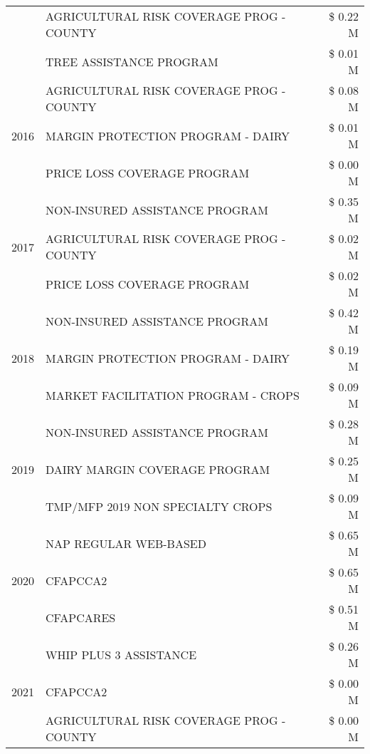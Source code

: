 \begin{tabular}{llr}
 & AGRICULTURAL RISK COVERAGE PROG - COUNTY & \$ 0.22 M \\
 & TREE ASSISTANCE PROGRAM & \$ 0.01 M \\
\cline{1-3}
\multirow[t]{3}{*}{2016} & AGRICULTURAL RISK COVERAGE PROG - COUNTY & \$ 0.08 M \\
 & MARGIN PROTECTION PROGRAM - DAIRY & \$ 0.01 M \\
 & PRICE LOSS COVERAGE PROGRAM & \$ 0.00 M \\
\cline{1-3}
\multirow[t]{3}{*}{2017} & NON-INSURED ASSISTANCE PROGRAM & \$ 0.35 M \\
 & AGRICULTURAL RISK COVERAGE PROG - COUNTY & \$ 0.02 M \\
 & PRICE LOSS COVERAGE PROGRAM & \$ 0.02 M \\
\cline{1-3}
\multirow[t]{3}{*}{2018} & NON-INSURED ASSISTANCE PROGRAM & \$ 0.42 M \\
 & MARGIN PROTECTION PROGRAM - DAIRY & \$ 0.19 M \\
 & MARKET FACILITATION PROGRAM - CROPS & \$ 0.09 M \\
\cline{1-3}
\multirow[t]{3}{*}{2019} & NON-INSURED ASSISTANCE PROGRAM & \$ 0.28 M \\
 & DAIRY MARGIN COVERAGE PROGRAM & \$ 0.25 M \\
 & TMP/MFP 2019 NON SPECIALTY CROPS & \$ 0.09 M \\
\cline{1-3}
\multirow[t]{3}{*}{2020} & NAP REGULAR WEB-BASED & \$ 0.65 M \\
 & CFAPCCA2 & \$ 0.65 M \\
 & CFAPCARES & \$ 0.51 M \\
\cline{1-3}
\multirow[t]{3}{*}{2021} & WHIP PLUS 3 ASSISTANCE & \$ 0.26 M \\
 & CFAPCCA2 & \$ 0.00 M \\
 & AGRICULTURAL RISK COVERAGE PROG - COUNTY & \$ 0.00 M \\
\cline{1-3}
\bottomrule
\end{tabular}
